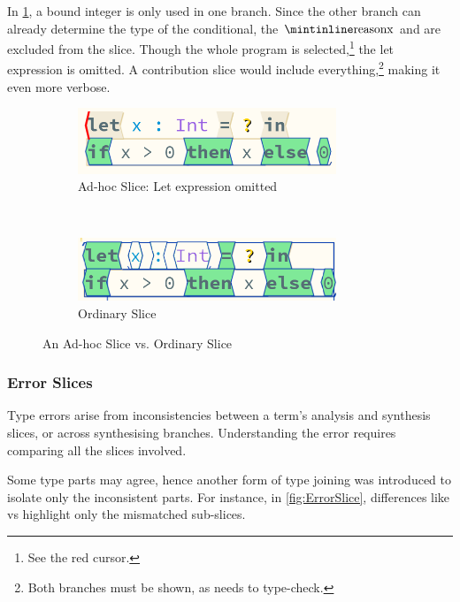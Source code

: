 In \cref{fig:LetSliceOmitted}, a bound integer  is only used in one branch. Since the other branch can already determine the type of the conditional, the $\code{x}$  and  are excluded from the slice. Though the whole program is selected,\footnote{See the red cursor.} the let expression is omitted. A contribution slice would include everything,\footnote{Both branches must be shown, as  needs to type-check.} making it even more verbose.
\begin{figure}
\centering
\begin{subfigure}{0.45\textwidth}
\centering

\includegraphics[width=0.85\textwidth]{Media/Figures/Unused_let}
\caption{Ad-hoc Slice: Let expression omitted}
\end{subfigure}$\qquad$
\begin{subfigure}{0.45\textwidth}
\centering

\includegraphics[width=0.85\textwidth]{Media/Figures/Unused_let_ordinary}
\caption{Ordinary Slice}
\end{subfigure}

\caption{An Ad-hoc Slice vs. Ordinary Slice}
\label{fig:LetSliceOmitted}
\end{figure}


\subsubsection{Error Slices}
\label{sec:ErrorSlices}
Type errors arise from inconsistencies between a term’s analysis and synthesis slices, or across synthesising branches. Understanding the error requires comparing all the slices involved.

Some type parts may agree, hence another form of type joining was introduced to isolate only the inconsistent parts. For instance, in \cref{fig:ErrorSlice}, differences like  vs  highlight only the mismatched sub-slices.


